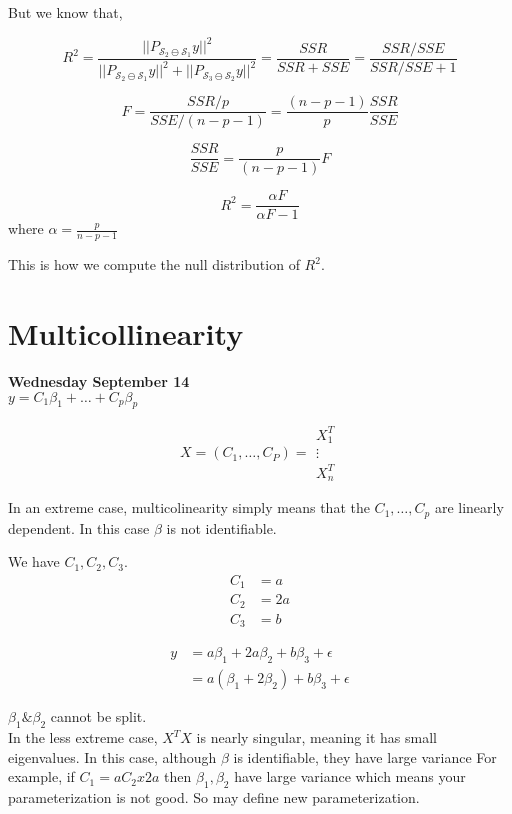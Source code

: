 \documentclass[11pt,fleqn]{book} %
\begin{document}
But we know that, 

$$R^2 = \frac{||P_{\mathscr{S}_2 \ominus \mathscr{S}_1}y||^2}{||P_{\mathscr{S}_2 \ominus \mathscr{S}_1}y||^2 + ||P_{\mathscr{S}_3 \ominus \mathscr{S}_2}y||^2} = \frac{SSR}{SSR + SSE} = \frac{SSR/SSE}{SSR/SSE + 1} $$

$$ F = \frac{SSR/p}{SSE/(n-p-1)} = \frac{(n-p-1)}{p} \frac{SSR}{SSE} $$

$$ \frac{SSR}{SSE} = \frac{p}{(n-p-1)} F$$

$$R^2 = \frac{\alpha F}{\alpha F - 1}$$
where $\alpha = \frac{p}{n-p-1}$

This is how we compute the null distribution of $R^2$. \\

\section{Multicollinearity}

\textbf{Wednesday September 14}\\

$y = C_1 \beta_1 + \dots + C_p \beta_p$

$$ X = (C_1, \dots, C_P) = \begin{matrix}
	X^T_1\\
	\vdots\\
	X^T_n
\end{matrix}$$

In an extreme case, multicolinearity simply means that the $C_1, \dots, C_p$ are linearly dependent. In this case $\beta$ is not identifiable. 

	We have $C_1, C_2, C_3$.\\

	\begin{align*}
		C_1 &= a\\
		C_2 &= 2a\\
		C_3 &= b
	\end{align*}

	\begin{align*}
		y &= a\beta_1 + 2a \beta_2 + b\beta_3 + \epsilon\\
		&= a(\beta_1 + 2\beta_2) + b\beta_3 + \epsilon
	\end{align*}
	
	$\beta_1 \& \beta_2$ cannot be split. \\

	In the less extreme case, $X^TX$ is nearly singular, meaning it has small eigenvalues. In this case, although $\beta$ is identifiable, they have large variance For example, if $C_1 = a C_2 x 2a$ then $\beta_1, \beta_2$ have large variance which means your parameterization is not good. So may define new parameterization.
\end{document}
